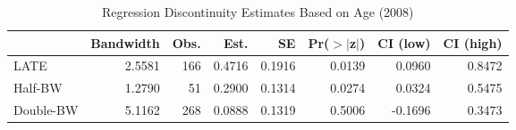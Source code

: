 \begin{table}[ht]
\centering
\begin{tabular}{lrrrrrrr}
  \hline
 & Bandwidth & Obs. & Est. & SE & Pr($>$$|$z$|$) & CI (low) & CI (high) \\ 
  \hline
LATE & 2.5581 & 166 & 0.4716 & 0.1916 & 0.0139 & 0.0960 & 0.8472 \\ 
  Half-BW & 1.2790 & 51 & 0.2900 & 0.1314 & 0.0274 & 0.0324 & 0.5475 \\ 
  Double-BW & 5.1162 & 268 & 0.0888 & 0.1319 & 0.5006 & -0.1696 & 0.3473 \\ 
   \hline
\end{tabular}
\caption{Regression Discontinuity Estimates Based on Age (2008)} 
\label{tab:rd2008y}
\end{table}
